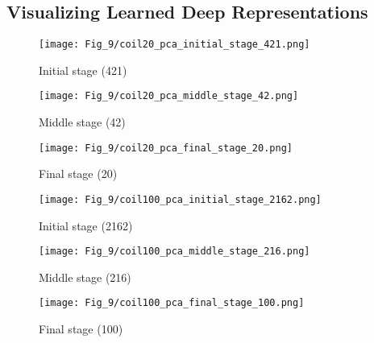\documentclass[10pt,twocolumn,letterpaper]{article}
\begin{document}
\subsection{Visualizing Learned Deep Representations}
\label{Ap_Displaying}
\begin{figure*}[t]
   \begin{subfigure}{0.33\linewidth}
   \centering
    \texttt{[image: Fig\_9/coil20\_pca\_initial\_stage\_421.png]}
    \vspace{-5pt}
    \caption{Initial stage (421)}
           \vspace{20pt}
   \end{subfigure}
   \begin{subfigure}{0.33\linewidth}
   \centering
    \texttt{[image: Fig\_9/coil20\_pca\_middle\_stage\_42.png]}
    \vspace{-5pt}
    \caption{Middle stage (42)}
       \vspace{20pt}
   \end{subfigure}
   \begin{subfigure}{0.33\linewidth}
   \centering
   \texttt{[image: Fig\_9/coil20\_pca\_final\_stage\_20.png]}
   \vspace{-5pt}
   \caption{Final stage (20)}
   \vspace{20pt}
   \end{subfigure}
   
   \begin{subfigure}{0.33\linewidth}
   \centering
    \texttt{[image: Fig\_9/coil100\_pca\_initial\_stage\_2162.png]}
    \vspace{-5pt}
    \caption{Initial stage (2162)}
           \vspace{20pt}
   \end{subfigure}
   \begin{subfigure}{0.33\linewidth}
   \centering
    \texttt{[image: Fig\_9/coil100\_pca\_middle\_stage\_216.png]}
    \vspace{-5pt}
    \caption{Middle stage (216)}
           \vspace{20pt}
   \end{subfigure}
   \begin{subfigure}{0.33\linewidth}
   \centering
       \texttt{[image: Fig\_9/coil100\_pca\_final\_stage\_100.png]}
   \vspace{-5pt}
   \caption{Final stage (100)}
          \vspace{20pt}
   \end{subfigure}


\end{figure*}
\end{document}
